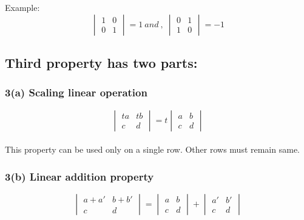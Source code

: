 \documentclass[]{article}
\begin{document}
\noindent
Example:\\

\noindent
\[
\begin{vmatrix}
	1&0\\
	0&1
\end{vmatrix}=1 \ and \ , \  
\begin{vmatrix}
	0&1\\
	1&0
\end{vmatrix}=-1
\]

\vspace{10pt}

\subsection{Third property has two parts:}
\vspace{10pt}

\subsubsection{ 3(a) Scaling linear operation}
\vspace{10pt}

\[
\begin{vmatrix}
	ta&tb\\
	c&d
\end{vmatrix}=t \begin{vmatrix}
a&b\\
c&d
\end{vmatrix}
\]\\

This property can be used only on a single row. Other rows must remain same.

\vspace{10pt}

\subsubsection{3(b) Linear addition property}
\vspace{10pt}

\[
\begin{vmatrix}
	a+a'&b+b'\\
	c&d
\end{vmatrix}=\begin{vmatrix} 
a&b\\
c&d
\end{vmatrix}+\begin{vmatrix}
a'&b'\\
c&d
\end{vmatrix}
\]\\
\end{document}
